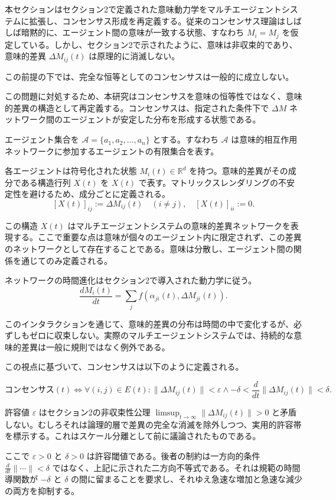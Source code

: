 \documentclass[11pt,a4paper]{article}
\theoremstyle{definition}
\begin{document}
本セクションはセクション2で定義された意味動力学をマルチエージェントシステムに拡張し、コンセンサス形成を再定義する。従来のコンセンサス理論はしばしば暗黙的に、エージェント間の意味が一致する状態、すなわち $M_i = M_j$ を仮定している。しかし、セクション2で示されたように、意味は非収束的であり、意味的差異 $\Delta M_{ij}(t)$ は原理的に消滅しない。

この前提の下では、完全な恒等としてのコンセンサスは一般的に成立しない。

この問題に対処するため、本研究はコンセンサスを意味の恒等性ではなく、意味的差異の構造として再定義する。コンセンサスは、指定された条件下で $\Delta M$ ネットワーク間のエージェントが安定した分布を形成する状態である。

エージェント集合を $\mathcal{A} = \{a_1, a_2, \ldots, a_n\}$ とする。すなわち $\mathcal{A}$ は意味的相互作用ネットワークに参加するエージェントの有限集合を表す。

各エージェントは符号化された状態 $M_i(t) \in \mathbb{R}^d$ を持つ。意味的差異がその成分である構造行列 $X(t)$ を $X(t)$ で表す。マトリックスレンダリングの不安定性を避けるため、成分ごとに定義される。
\[
[X(t)]_{ij} := \Delta M_{ij}(t) \quad (i \neq j), \quad [X(t)]_{ii} := 0.
\]

この構造 $X(t)$ はマルチエージェントシステムの意味的差異ネットワークを表現する。ここで重要な点は意味が個々のエージェント内に限定されず、この差異のネットワークとして存在することである。意味は分散し、エージェント間の関係を通じてのみ定義される。

ネットワークの時間進化はセクション2で導入された動力学に従う。
\[
\frac{dM_i(t)}{dt} = \sum_j f(\alpha_{ji}(t), \Delta M_{ji}(t)).
\]

このインタラクションを通じて、意味的差異の分布は時間の中で変化するが、必ずしもゼロに収束しない。実際のマルチエージェントシステムでは、持続的な意味的差異は一般に規則ではなく例外である。

この視点に基づいて、コンセンサスは以下のように定義される。

\[
\text{コンセンサス}(t) \Leftrightarrow \forall (i,j) \in E(t) : \|\Delta M_{ij}(t)\| < \varepsilon \land -\delta < \frac{d}{dt}\|\Delta M_{ij}(t)\| < \delta.
\]

許容値 $\varepsilon$ はセクション2の非収束性公理 $\limsup_{t \to \infty} \|\Delta M_{ij}(t)\| > 0$ と矛盾しない。むしろそれは論理的層で差異の完全な消滅を除外しつつ、実用的許容帯を標示する。これはスケール分離として前に議論されたものである。

ここで $\varepsilon > 0$ と $\delta > 0$ は許容閾値である。後者の制約は一方向的条件 $\frac{d}{dt}\|\cdots\| < \delta$ ではなく、上記に示された二方向不等式である。それは規範の時間導関数が $-\delta$ と $\delta$ の間に留まることを要求し、それゆえ急速な増加と急速な減少の両方を抑制する。
\end{document}
